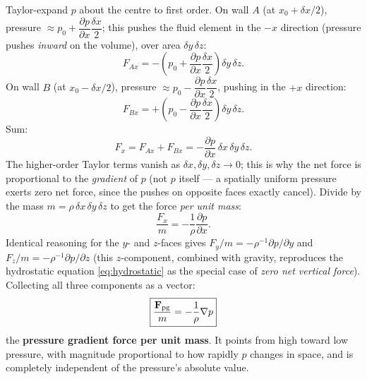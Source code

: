 \documentclass[11pt]{article}
\begin{document}
Taylor-expand $p$ about the centre to first order. On wall $A$ (at $x_0+\delta x/2$), pressure $\approx p_0 + \dfrac{\partial p}{\partial x}\dfrac{\delta x}{2}$; this pushes the fluid element in the $-x$ direction (pressure pushes \emph{inward} on the volume), over area $\delta y\,\delta z$:
\begin{equation}
F_{Ax} = -\left(p_0+\frac{\partial p}{\partial x}\frac{\delta x}{2}\right)\delta y\,\delta z.
\end{equation}
On wall $B$ (at $x_0-\delta x/2$), pressure $\approx p_0 - \dfrac{\partial p}{\partial x}\dfrac{\delta x}{2}$, pushing in the $+x$ direction:
\begin{equation}
F_{Bx} = +\left(p_0-\frac{\partial p}{\partial x}\frac{\delta x}{2}\right)\delta y\,\delta z.
\end{equation}
Sum:
\begin{equation}
F_x = F_{Ax}+F_{Bx} = -\frac{\partial p}{\partial x}\,\delta x\,\delta y\,\delta z.
\end{equation}
The higher-order Taylor terms vanish as $\delta x,\delta y,\delta z\to0$; this is why the net force is proportional to the \emph{gradient} of $p$ (not $p$ itself — a spatially uniform pressure exerts zero net force, since the pushes on opposite faces exactly cancel). Divide by the mass $m=\rho\,\delta x\,\delta y\,\delta z$ to get the force \emph{per unit mass}:
\begin{equation}
\frac{F_x}{m} = -\frac{1}{\rho}\frac{\partial p}{\partial x}.
\end{equation}
Identical reasoning for the $y$- and $z$-faces gives $F_y/m = -\rho^{-1}\partial p/\partial y$ and $F_z/m=-\rho^{-1}\partial p/\partial z$ (this $z$-component, combined with gravity, reproduces the hydrostatic equation \eqref{eq:hydrostatic} as the special case of \emph{zero net vertical force}). Collecting all three components as a vector:
\begin{equation}
\boxed{\frac{\mathbf F_{\rm pg}}{m} = -\frac{1}{\rho}\nabla p}
\label{eq:pgf}
\end{equation}
the \textbf{pressure gradient force per unit mass}. It points from high toward low pressure, with magnitude proportional to how rapidly $p$ changes in space, and is completely independent of the pressure's absolute value.
\end{document}
